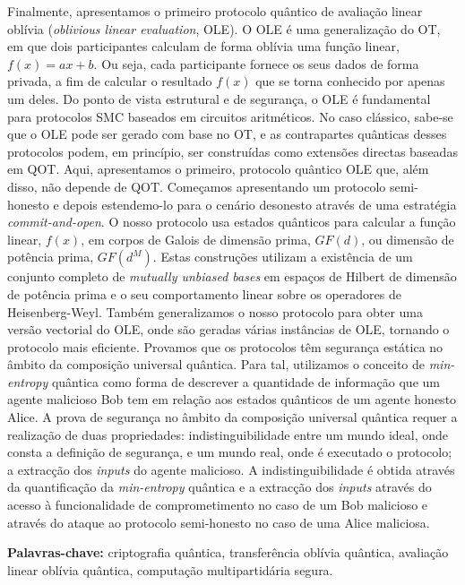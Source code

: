 \documentclass[12pt]{report}
\begin{document}
Finalmente, apresentamos o primeiro protocolo quântico de  avaliação linear oblívia (\textit{oblivious linear evaluation}, OLE). O OLE é uma generalização do OT, em que dois participantes calculam de forma oblívia uma função linear, $f(x) = ax + b$. Ou seja, cada participante fornece os seus dados de forma privada, a fim de calcular o resultado $f(x)$ que se torna conhecido por apenas um deles. Do ponto de vista estrutural e de segurança, o OLE é fundamental para protocolos SMC baseados em circuitos aritméticos. No caso clássico, sabe-se que o OLE pode ser gerado com base no OT, e as contrapartes quânticas desses protocolos podem, em princípio, ser construídas como extensões directas baseadas em QOT. Aqui, apresentamos o primeiro, protocolo quântico OLE que, além disso, não depende de QOT. Começamos apresentando um protocolo semi-honesto e depois estendemo-lo para o cenário desonesto através de uma estratégia \textit{commit-and-open}. O nosso protocolo usa estados quânticos para calcular a função linear, $f(x)$, em corpos de Galois de dimensão prima, $GF(d)$, ou dimensão de potência prima, $GF(d^M)$. Estas construções utilizam a existência de um conjunto completo de \textit{mutually unbiased bases} em espaços de Hilbert de dimensão de potência prima e o seu comportamento linear sobre os operadores de Heisenberg-Weyl. Também generalizamos o nosso protocolo para obter uma versão vectorial do OLE, onde são geradas várias instâncias de OLE, tornando o protocolo mais eficiente. Provamos que os protocolos têm segurança estática no âmbito da composição universal quântica. Para tal, utilizamos o conceito de \textit{min-entropy} quântica como forma de descrever a quantidade de informação que um agente malicioso Bob tem em relação aos estados quânticos de um agente honesto Alice. A prova de segurança no âmbito da composição universal quântica requer a realização de duas propriedades: indistinguibilidade entre um mundo ideal, onde consta a definição de segurança, e um mundo real, onde é executado o protocolo; a extracção dos \textit{inputs} do agente malicioso. A indistinguibilidade é obtida através da quantificação da \textit{min-entropy} quântica e a extracção dos \textit{inputs} através do acesso à funcionalidade de comprometimento no caso de um Bob malicioso e através do ataque ao protocolo semi-honesto no caso de uma Alice maliciosa.


\vfill
\begin{flushleft}
\textbf{Palavras-chave:} criptografia qu\^{a}ntica, transferência oblívia quântica, avaliação linear oblívia quântica, computação multipartidária segura.
\end{flushleft}
\end{document}
